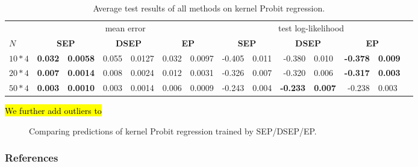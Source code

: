 \documentclass{article} %
\newcommand{\ica}{\hspace{0.25cm}}
\begin{document}
\begin{table} 
\small
\centering \label{tab:kernel} 
 \caption{ Average test results of all methods on kernel Probit regression.}
\begin{tabular}{l@{\ica}r@{$\pm$}l@{\ica}r@{$\pm$}l@{\ica}r@{$\pm$}l@{\ica}r@{$\pm$}l@{\ica}r@{$\pm$}
	l@{\ica}r@{$\pm$}l@{\ica}r@{$\pm$}}\hline 
{} & \multicolumn{6}{c}{mean error} & \multicolumn{6}{c}{test log-likelihood} \\
\bf{$N$}&\multicolumn{2}{c}{\bf{ SEP }}&\multicolumn{2}{c}{\bf{ DSEP }}&\multicolumn{2}{c}{\bf{ EP }} &\multicolumn{2}{c}{\bf{ SEP }}&\multicolumn{2}{c}{\bf{ DSEP }}&\multicolumn{2}{c}{\bf{ EP }} \\ \hline 
%
$10*4$&\bf{0.032}&\bf{0.0058}&0.055&0.0127&0.032&0.0097 
	&-0.405&0.011&-0.380&0.010&\bf{-0.378}&\bf{0.009} \\
%
$20*4$&\bf{0.007}&\bf{0.0014}&0.008&0.0024&0.012&0.0031 
	&-0.326&0.007&-0.320&0.006&\bf{-0.317}&\bf{0.003} \\
%
$50*4$&\bf{0.003}&\bf{0.0010}&0.003&0.0014&0.006&0.0009 
	&-0.243&0.004&\bf{-0.233}&\bf{0.007}&-0.238&0.003 \\
%
 \hline \end{tabular} 
 \end{table} 


\hl{We further add outliers to }

\begin{figure}
\centering
\def\svgwidth{1\linewidth}

\label{fig:kernel_increase_n}
\caption{Comparing predictions of kernel Probit regression trained by SEP/DSEP/EP.}
\end{figure}


\subsubsection*{References}
\renewcommand{\section}[2]{}
\small


\end{document}

